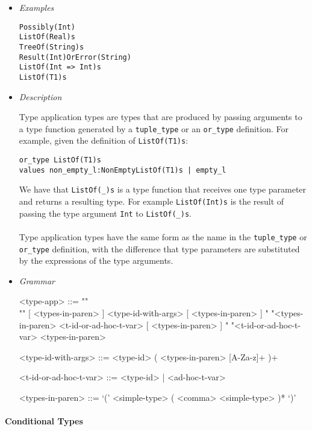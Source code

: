 \documentclass{article}
\begin{document}
\begin{itemize}
\item \textit{Examples}
\begin{verbatim}
Possibly(Int)
ListOf(Real)s
TreeOf(String)s 
Result(Int)OrError(String)
ListOf(Int => Int)s
ListOf(T1)s
\end{verbatim}

\item \textit{Description}

Type application types are types that are produced by passing arguments
to a type function generated by a \texttt{tuple_type} or an \texttt{or_type}
definition. For example, given the definition of \texttt{ListOf(T1)s}:
\begin{verbatim}
or_type ListOf(T1)s
values non_empty_l:NonEmptyListOf(T1)s | empty_l
\end{verbatim}
We have that \texttt{ListOf(_)s} is a type function that receives one type parameter
and returns a resulting type. For example \texttt{ListOf(Int)s} is the result
of passing the type argument \texttt{Int} to \texttt{ListOf(_)s}.
\\\\
Type application types have the same form as the name in the
\texttt{tuple_type} or \texttt{or_type} definition, with the difference that
type parameters are substituted by the expressions of the type arguments.

\item \textit{Grammar}
\begin{grammar}
<type-app> ::= ""\\""
[ <types-in-paren> ] <type-id-with-args> [ <types-in-paren> ]
\alt " "<types-in-paren> <t-id-or-ad-hoc-t-var> [ <types-in-paren> ]
\alt " "<t-id-or-ad-hoc-t-var> <types-in-paren>

<type-id-with-args> ::= <type-id> ( <types-in-paren> [A-Za-z]+ )+

<t-id-or-ad-hoc-t-var> ::= <type-id> | <ad-hoc-t-var>

<types-in-paren> ::= `(' <simple-type> ( <comma> <simple-type> )* `)'
\end{grammar}
\end{itemize}

\paragraph{Conditional Types}
\end{document}
